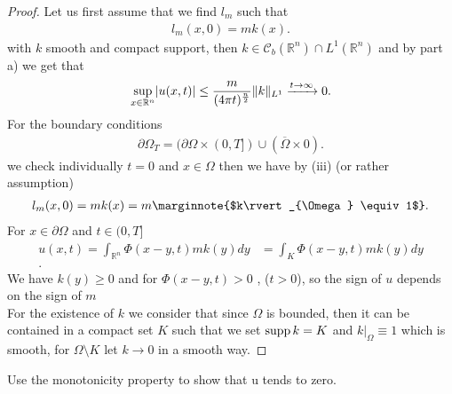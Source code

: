   \begin{proof}
   Let us first assume that we find $l_m$ such that 
   \begin{align*}
    l_m(x,0) = mk(x)
   .\end{align*}
   with $k$ smooth and compact support, then $k \in  \mathcal{C}_b(\mathbb{R}^{n} ) \cap L^{1}(\mathbb{R}^{n} ) $ 
   and by part a) we get that 
   \begin{align*}
     \sup_{x \in  \mathbb{R}^{n} }\lvert u(x,t)\rvert \le  \frac{m}{(4\pi t)^{\frac{n}{2}} }\|k\|_{L^{1} } \xrightarrow{t\to \infty} 0
   .\end{align*}
   For the boundary conditions
   \begin{align*}
    \partial \Omega_T = (\partial \Omega  \times  (0,T]) \cup (\overline{\Omega } \times  0 )
   .\end{align*}
   we check individually
   $t = 0$ and $x \in  \Omega $ then we have by (iii) (or rather assumption)
   \begin{align*}
     l_m(x,0)  = mk(x) = m \marginnote{$k\rvert_{\Omega } \equiv 1$}
   .\end{align*}
   For $x \in  \partial \Omega $ and $t \in  (0,T]$
   \begin{align*}
     u(x,t) = \int_{\mathbb{R}^{n} }\Phi(x-y,t)mk(y) dy &=  \int_{K} \Phi(x-y,t)mk(y) dy\\
   .\end{align*}
   We have $k(y) \ge 0$ and for $\Phi(x-y,t) > 0$ , ($t>0$), so the sign of $u$ depends on the sign of $m$\\[1ex]
   For the existence of $k$ we consider that since $\Omega $ is bounded, then it can be contained in a compact set $K$ such that 
   we set $\operatorname*{supp} k = K$ and $k \rvert_{\Omega } \equiv 1$ which is smooth, for $\Omega  \setminus K$ let $k \to  0$ in a smooth way.
  \end{proof}
  \begin{exercise}[c]
   Use the monotonicity property to show that u tends to zero. 
  \end{exercise}
